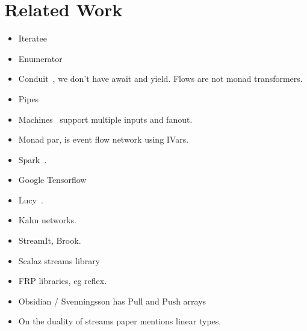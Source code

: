 \section{Related Work}

\begin{itemize}
\item Iteratee~\cite{Kiselyov:iteratee}
\item Enumerator~\cite{hackage:enumerator}
\item Conduit~\cite{hackage:conduit}, we don't have await and yield. Flows are not monad transformers.
\item Pipes~\cite{hackage:pipes}
\item Machines~\cite{hackage:machines} support multiple inputs and fanout.
\item Monad par, is event flow network using IVars.
\item Spark~\cite{Zaharia:RDDs}.
\item Google Tensorflow
\item Lucy~\cite{Mandel:Lucy}.
\item Kahn networks.
\item StreamIt, Brook.
\item Scalaz streams library~\cite{github:scalaz-streams}
\item FRP libraries, eg reflex.
\item Obsidian / Svenningsson has Pull and Push arrays
\item On the duality of streams paper mentions linear types.
\end{itemize}


